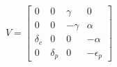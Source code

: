 \documentclass[preview]{standalone}
\begin{document}
\begin{align*}
V = \begin{bmatrix} 0 & 0 & \gamma & 0 \\ 0 & 0 & -\gamma & \alpha \\ \delta_c & 0 & 0 & -\alpha \\ 0 & \delta_p & 0 & -\epsilon_p \end{bmatrix}
\end{align*}
\end{document}
